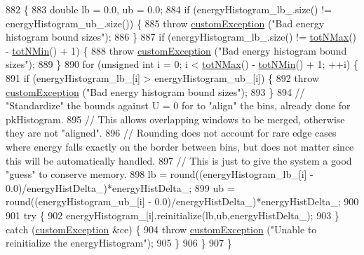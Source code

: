 \begin{DoxyCode}
882                                              \{
883     \textcolor{keywordtype}{double} lb = 0.0, ub = 0.0;
884     \textcolor{keywordflow}{if} (energyHistogram\_lb\_.size() != energyHistogram\_ub\_.size()) \{
885         \textcolor{keywordflow}{throw} \hyperlink{classcustom_exception}{customException} (\textcolor{stringliteral}{"Bad energy histogram bound sizes"});
886     \}
887     \textcolor{keywordflow}{if} (energyHistogram\_lb\_.size() != \hyperlink{classsim_system_aee2c65ecb43a35c0c4d070cdb45f7dc0}{totNMax}() - \hyperlink{classsim_system_af10842e0eaa638373b8717c87b47e6bc}{totNMin}() + 1) \{
888         \textcolor{keywordflow}{throw} \hyperlink{classcustom_exception}{customException} (\textcolor{stringliteral}{"Bad energy histogram bound sizes"});
889     \}
890     \textcolor{keywordflow}{for} (\textcolor{keywordtype}{unsigned} \textcolor{keywordtype}{int} i = 0; i < \hyperlink{classsim_system_aee2c65ecb43a35c0c4d070cdb45f7dc0}{totNMax}() - \hyperlink{classsim_system_af10842e0eaa638373b8717c87b47e6bc}{totNMin}() + 1; ++i) \{
891         \textcolor{keywordflow}{if} (energyHistogram\_lb\_[i] > energyHistogram\_ub\_[i]) \{
892             \textcolor{keywordflow}{throw} \hyperlink{classcustom_exception}{customException} (\textcolor{stringliteral}{"Bad energy histogram bound sizes"});
893         \}
894         \textcolor{comment}{// "Standardize" the bounds against U = 0 for to "align" the bins, already done for pkHistogram.}
895         \textcolor{comment}{// This allows overlapping windows to be merged, otherwise they are not "aligned".}
896         \textcolor{comment}{// Rounding does not account for rare edge cases where energy falls exactly on the border between
       bins, but does not matter since this will be automatically handled.}
897         \textcolor{comment}{// This is just to give the system a good "guess" to conserve memory.}
898         lb = round((energyHistogram\_lb\_[i] - 0.0)/energyHistDelta\_)*energyHistDelta\_;
899         ub = round((energyHistogram\_ub\_[i] - 0.0)/energyHistDelta\_)*energyHistDelta\_;
900 
901         \textcolor{keywordflow}{try} \{
902             energyHistogram\_[i].reinitialize(lb,ub,energyHistDelta\_);
903         \} \textcolor{keywordflow}{catch} (\hyperlink{classcustom_exception}{customException} &ce) \{
904             \textcolor{keywordflow}{throw} \hyperlink{classcustom_exception}{customException} (\textcolor{stringliteral}{"Unable to reinitialize the energyHistogram"});
905         \}
906     \}
907 \}
\end{DoxyCode}

